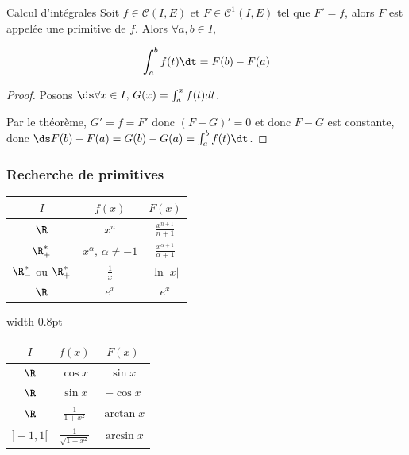 \begin{corollaire}{Calcul d'intégrales}{}
    Soit $f \in \mathscr C(I, E)$ et $F \in \mathscr C^1(I, E)$ tel que 
    $F' = f$, alors $F$ est appelée une primitive de $f$. Alors $\forall a, b \in I$, 
    
    \[\displaystyle \int_a^b f(t) \dt = F(b) - F(a)\]
\end{corollaire}


\begin{proof}
    Posons $\ds \forall x \in I, \, G(x) = \int_a^x f(t) dt$.

    Par le théorème, $G' = f = F'$ donc $(F - G)' = 0$ et donc $F - G$ est constante, 
    donc $\ds F(b) - F(a) = G(b) - G(a) = \int_a^b f(t) \dt$.
\end{proof}

\subsubsection{Recherche de primitives}
\begin{table}[htpb]
\centering
\renewcommand{\arraystretch}{1.6}
\begin{minipage}[t]{0.44\linewidth}
    \centering
    \begin{tabular}{ccc}
        \toprule
        $I$ & $f(x)$ & $F(x)$ \\
        \midrule
        $\R$     & $x^n$         & $\frac{x^{n+1}}{n+1}$ \\
        $\R^*_+$ & $x^\alpha$, $\alpha \not = -1$   & $\frac{x^{\alpha+1}}{\alpha+1}$ \\
        $\R^*_-$ ou $\R^*_+$   & $\frac{1}{x}$ & $\ln|x|$ \\
        $\R$     & $e^x$         & $e^x$ \\
        \bottomrule
    \end{tabular}
\end{minipage}
\hfill
{\color{black!50}\vrule width 0.8pt}%
\hfill
\begin{minipage}[t]{0.44\linewidth}
    \centering
    \begin{tabular}{ccc}
        \toprule
        $I$ & $f(x)$ & $F(x)$ \\
        \midrule
        $\R$      & $\cos x$                  & $\sin x$ \\
        $\R$      & $\sin x$                  & $-\cos x$ \\
        $\R$      & $\frac{1}{1+x^2}$         & $\arctan x$ \\
        $]-1, 1[$ & $\frac{1}{\sqrt{1-x^2}}$  & $\arcsin x$ \\
        \bottomrule
    \end{tabular}
\end{minipage}
\end{table}

